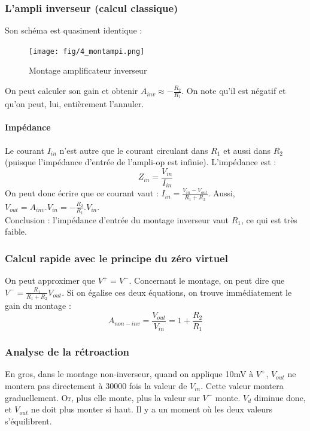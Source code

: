 \documentclass[a4paper]{article}
\begin{document}
    \subsubsection{L'ampli inverseur (calcul classique)}
    Son schéma est quasiment identique :
    \begin{figure}[H]
        \begin{center}
            \texttt{[image: fig/4\_montampi.png]}
            \caption{Montage amplificateur inverseur}
            \label{fig:4_montampi}
        \end{center}
    \end{figure}
    On peut calculer son gain et obtenir $A_{inv} \approx - \frac{R_2}{R_1}$. On 
    note qu'il est négatif et qu'on peut, lui, entièrement l'annuler.

    \paragraph{Impédance}
    Le courant $I_{in}$ n'est autre que le courant circulant dans $R_1$ et aussi
    dans $R_2$ (puisque l'impédance d'entrée de l'ampli-op est infinie). L'impédance est :
    $$ Z_{in} = \frac{V_{in}}{I_{in}}$$
    On peut donc écrire que ce courant vaut : $I_{in} = \frac{V_{in} - V_{out}}{R_1+R_2} $.
    Aussi, $V_{out} = A_{inv}.V_{in} = -\frac{R_2}{R_1}.V_{in} $.\\

    Conclusion : l'impédance d'entrée du montage inverseur vaut $R_1$, ce qui est
    très faible.

    \subsubsection{Calcul rapide avec le principe du zéro virtuel}
    On peut approximer que $V^+ = V^-$. Concernant le montage, on peut dire que
    $V^- = \frac{R_1}{R_1+R_2}V_{out}$. Si on égalise ces deux équations, on trouve
    immédiatement le gain du montage : 
    $$ A_{non-inv} = \frac{V_{out}}{V_{in}} = 1 + \frac{R_2}{R_1} $$

    \subsubsection{Analyse de la rétroaction}
    En gros, dans le montage non-inverseur, quand on applique 10mV à $V^+$, 
    $V_{out}$ ne montera pas directement à 30000 fois la valeur de $V_{in}$.
    Cette valeur montera graduellement. Or, plus elle monte, plus la valeur 
    sur $V^-$ monte. $V_d$ diminue donc, et $V_{out}$ ne doit plus monter
    si haut. Il y a un moment où les deux valeurs s'équilibrent.\\
\end{document}
